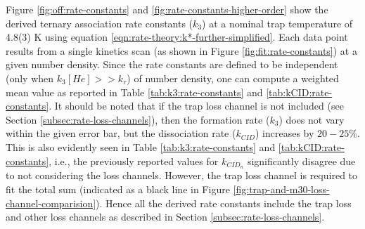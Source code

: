 Figure \ref{fig:off:rate-constants} and \ref{fig:rate-constants-higher-order}
show the derived ternary association rate constants ($k_3$) at a nominal trap
temperature of 4.8(3) K using equation
\ref{eqn:rate-theory:k*-further-simplified}. Each data point results from a
single kinetics scan (as shown in Figure \ref{fig:fit:rate-constants}) at a
given number density. Since the rate constants are defined to be independent
(only when $k_3[He] >> k_r$) of number density, one can compute a weighted mean
value as reported in Table \ref{tab:k3:rate-constants} and
\ref{tab:kCID:rate-constants}. It should be noted that if the trap loss channel
is not included (see Section \ref{subsec:rate-loss-channels}), then the
formation rate ($k_3$) does not vary within the given error bar, but the
dissociation rate ($k_{CID}$) increases by $20-25\%$. This is also evidently
seen in Table \ref{tab:k3:rate-constants} and
\ref{tab:kCID:rate-constants}, i.e., the previously reported values
\cite{Brunken2017} for $k_{CID_n}$ significantly disagree due to
not considering the loss channels. However, the trap loss channel is
required to fit the total sum (indicated as a black line in Figure
\ref{fig:trap-and-m30-loss-channel-comparision}). Hence all the derived rate
constants include the trap loss and other loss channels as described in Section
\ref{subsec:rate-loss-channels}.